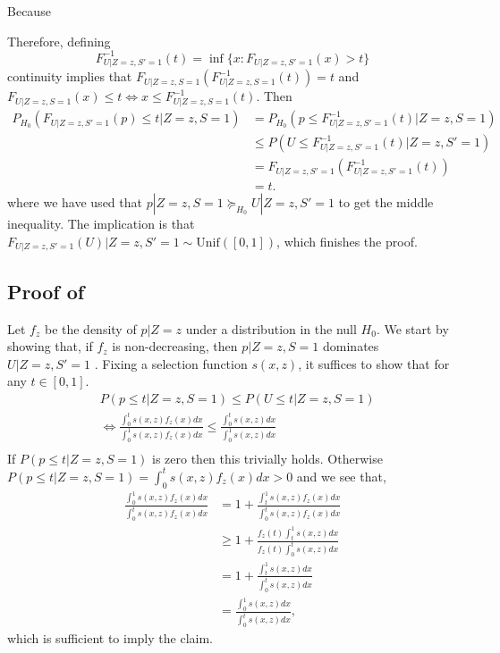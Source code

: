 \documentclass{article}
\begin{document}
\begin{appendix}
Because 

Therefore, defining 
\begin{equation*}
    F^{-1}_{U |Z=z, S'=1}(t)  = \inf \{x: F_{U |Z=z, S' = 1}(x) > t  \}
\end{equation*}
continuity implies that $F_{U|Z=z, S =1}(F^{-1}_{U |Z=z, S=1}(t)) = t$ and $F_{U | Z=z, S = 1}(x) \leq t \iff x \leq  F^{-1}_{U | Z=z, S = 1}(t)$. Then 
\begin{align*}
    P_{H_0}(F_{U | Z=z, S' = 1}(p) \leq  t |Z=z, S=1) &= P_{H_0}(p \leq F_{U |Z=z,  S' = 1}^{-1}(t) | Z=z, S=1) \\
    &\leq P(U \leq F_{U |Z=z, S' = 1}^{-1}(t) |Z=z, S'=1) \\
    &=F_{U|Z=z, S'=1}(F_{U|Z=z, S' = 1}^{-1}(t)) \\
    &=t. 
\end{align*}
where we have used that $p | Z=z, S=1 \succeq_{H_0} U |Z=z, S'=1$ to get the middle inequality. The implication is that $F_{U|Z=z, S' = 1}(U) |Z=z, S' = 1 \sim \text{Unif}([0, 1])$, which finishes the proof.

\fi 
 
\subsection{Proof of }
Let $f_z$ be the density of $p |Z=z$ under a distribution in the null $H_0$. We start by showing that, if $f_z$ is non-decreasing, then $p |Z =z, S =1$ dominates $U |Z=z, S'=1$ . Fixing a selection function $s(x, z)$, it suffices to show that for any $t \in [0, 1]$. 
    \begin{align*}
        &P(p \leq t | Z=z, S =1) \leq P(U \leq t |Z=z, S= 1)\\
        &\iff 
        \frac{\int_{0}^{t} s(x, z) f_z(x) dx }{\int_{0}^{1} s(x, z) f_z(x) dx } \leq \frac{\int_{0}^{t} s(x, z) dx}{\int_{0}^{1} s(x, z) dx } \\
    \end{align*}
If $P( p \leq t | Z=z, S = 1)$ is zero then this trivially holds. Otherwise $P( p \leq t | Z=z, S = 1) = \int_{0}^{t} s(x, z) f_z(x) dx  > 0$ and we see that, 
    \begin{align*}
        \frac{ \int_{0}^{1} s(x, z) f_z(x) dx }{\int_{0}^{t} s(x, z) f_z(x) dx } &= 1 + \frac{\int_{t}^{1} s(x, z) f_z(x) dx }{\int_{0}^{t} s(x, z) f_z(x) dx }\\
        &\geq 1 + \frac{f_z(t)\int_{t}^{1} s(x ,z) dx }{f_z(t)\int_{0}^{t} s(x, z)  dx }\\
        &= 1 + \frac{\int_{t}^{1} s(x, z) dx }{\int_{0}^{t} s(x, z)  dx }\\
        &= \frac{ \int_{0}^{1} s(x, z) dx }{\int_{0}^{t} s(x, z)  dx },
    \end{align*}
which is sufficient to imply the claim. 


\end{appendix}
\end{document}
